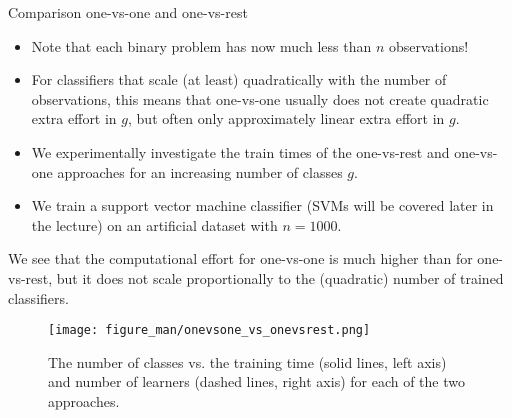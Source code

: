 \begin{vbframe}{Comparison one-vs-one and one-vs-rest}
\begin{itemize}
       \item Note that each binary problem has now much less than $n$ observations! 
    \item For classifiers that scale (at least) quadratically with the number of observations, this means that one-vs-one usually does not create quadratic extra effort in $g$, but often only approximately linear extra effort in $g$.
    \item We experimentally investigate the train times of the one-vs-rest and one-vs-one approaches for an increasing number of classes $g$. 
    \item We train a support vector machine classifier (SVMs will be covered later in the lecture) on an artificial dataset with $n = 1000$. 
  \end{itemize}
    \framebreak 
    We see that the computational effort for one-vs-one is much higher than for one-vs-rest, but it does not scale proportionally to the (quadratic) number of trained classifiers. 
    \begin{center}
    \begin{figure}
    \texttt{[image: figure\_man/onevsone\_vs\_onevsrest.png]}
    \caption{The number of classes vs. the training time (solid lines, left axis) and number of learners (dashed lines, right axis) for each of the two approaches.}
    \end{figure}
    \end{center}


  \end{vbframe}

\endlecture

